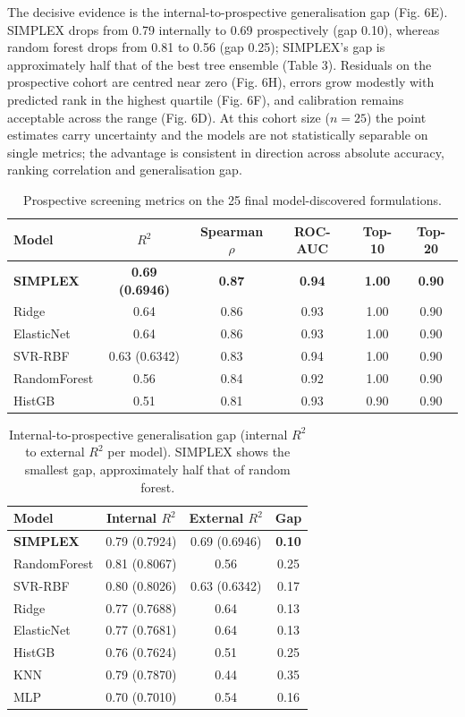 \documentclass[utf8]{FrontiersinHarvard}
\begin{document}
The decisive evidence is the internal-to-prospective generalisation gap (Fig. 6E). SIMPLEX drops from 0.79 internally to 0.69 prospectively (gap 0.10), whereas random forest drops from 0.81 to 0.56 (gap 0.25); SIMPLEX's gap is approximately half that of the best tree ensemble (Table 3). Residuals on the prospective cohort are centred near zero (Fig. 6H), errors grow modestly with predicted rank in the highest quartile (Fig. 6F), and calibration remains acceptable across the range (Fig. 6D). At this cohort size ($n = 25$) the point estimates carry uncertainty and the models are not statistically separable on single metrics; the advantage is consistent in direction across absolute accuracy, ranking correlation and generalisation gap.

\begin{table}[h]
\centering
\caption{Prospective screening metrics on the 25 final model-discovered formulations.}
\label{tab:ext}
\begin{tabular}{lccccc}
\toprule
Model & $R^2$ & Spearman $\rho$ & ROC-AUC & Top-10 & Top-20 \\
\midrule
\textbf{SIMPLEX} & \textbf{0.69 (0.6946)} & \textbf{0.87} & \textbf{0.94} & \textbf{1.00} & \textbf{0.90} \\
Ridge & 0.64 & 0.86 & 0.93 & 1.00 & 0.90 \\
ElasticNet & 0.64 & 0.86 & 0.93 & 1.00 & 0.90 \\
SVR-RBF & 0.63 (0.6342) & 0.83 & 0.94 & 1.00 & 0.90 \\
RandomForest & 0.56 & 0.84 & 0.92 & 1.00 & 0.90 \\
HistGB & 0.51 & 0.81 & 0.93 & 0.90 & 0.90 \\
\bottomrule
\end{tabular}
\end{table}

\begin{table}[h]
\centering
\caption{Internal-to-prospective generalisation gap (internal $R^2$ to external $R^2$ per model). SIMPLEX shows the smallest gap, approximately half that of random forest.}
\label{tab:gap}
\begin{tabular}{lccc}
\toprule
Model & Internal $R^2$ & External $R^2$ & Gap \\
\midrule
\textbf{SIMPLEX} & 0.79 (0.7924) & 0.69 (0.6946) & \textbf{0.10} \\
RandomForest & 0.81 (0.8067) & 0.56 & 0.25 \\
SVR-RBF & 0.80 (0.8026) & 0.63 (0.6342) & 0.17 \\
Ridge & 0.77 (0.7688) & 0.64 & 0.13 \\
ElasticNet & 0.77 (0.7681) & 0.64 & 0.13 \\
HistGB & 0.76 (0.7624) & 0.51 & 0.25 \\
KNN & 0.79 (0.7870) & 0.44 & 0.35 \\
MLP & 0.70 (0.7010) & 0.54 & 0.16 \\
\bottomrule
\end{tabular}
\end{table}
\end{document}
